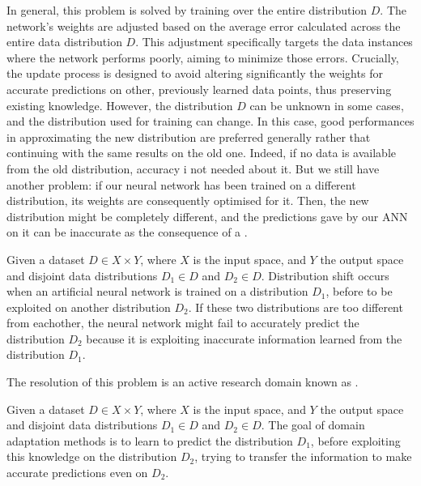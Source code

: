 In general, this problem is solved by training over the entire distribution $D$.
The network's weights are adjusted based on the average error calculated across the entire data distribution $D$.
This adjustment specifically targets the data instances where the network performs poorly, aiming to minimize those errors.
Crucially, the update process is designed to avoid altering significantly the weights for accurate predictions on other, previously learned data points, thus preserving existing knowledge.
However, the distribution $D$ can be unknown in some cases, and the distribution used for training can change.
In this case, good performances in approximating the new distribution are preferred generally rather that continuing with the same results on the old one.
Indeed, if no data is available from the old distribution, accuracy i not needed about it.
But we still have another problem: if our neural network has been trained on a different distribution, its weights are consequently optimised for it.
Then, the new distribution might be completely different, and the predictions gave by our ANN on it can be inaccurate as the consequence of a .

\begin{definition}
    Given a dataset $D \in X \times Y$, where $X$ is the input space, and $Y$ the output space and disjoint data
    distributions $D_1 \in D$ and $D_2 \in D$.
    Distribution shift occurs when an artificial neural network is trained on a distribution $D_1$, before to be
    exploited on another distribution $D_2$.
    If these two distributions are too different from eachother, the neural network might fail to accurately predict
    the distribution $D_2$ because it is exploiting inaccurate information learned from the distribution $D_1$.
\end{definition}

The resolution of this problem is an active research domain known as .
\begin{definition}
    Given a dataset $D \in X \times Y$, where $X$ is the input space, and $Y$ the output space and disjoint data
    distributions $D_1 \in D$ and $D_2 \in D$.
    The goal of domain adaptation methods is to learn to predict the distribution $D_1$, before 
    exploiting this knowledge on the distribution $D_2$, trying to transfer the information to make accurate predictions even on $D_2$.
\end{definition}

